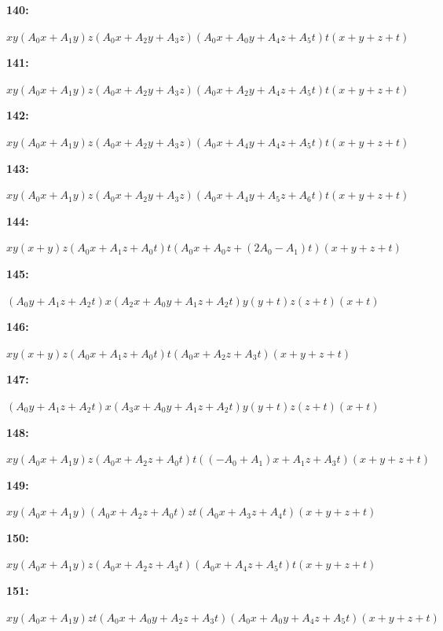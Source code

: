 \documentclass[12pt]{amsart}
\theoremstyle{plain}
\theoremstyle{remark}
\theoremstyle{definition}
\numberwithin{table}{section}
\begin{document}
\noindent\parbox[right]{9mm}{\textbf{140:}}\parbox{3mm}{\hfill}%
\parbox[t]{15cm}{\(xy(A_{0}x + A_{1}y)z(A_{0}x + A_{2}y + A_{3}z)(A_{0}x + A_{0}y + A_{4}z + A_{5}t)t(x + y + z + t)\)}

\noindent\parbox[right]{9mm}{\textbf{141:}}\parbox{3mm}{\hfill}%
\parbox[t]{15cm}{\(xy(A_{0}x + A_{1}y)z(A_{0}x + A_{2}y + A_{3}z)(A_{0}x + A_{2}y + A_{4}z + A_{5}t)t(x + y + z + t)\)}

\noindent\parbox[right]{9mm}{\textbf{142:}}\parbox{3mm}{\hfill}%
\parbox[t]{15cm}{\(xy(A_{0}x + A_{1}y)z(A_{0}x + A_{2}y + A_{3}z)(A_{0}x + A_{4}y + A_{4}z + A_{5}t)t(x + y + z + t)\)}

\noindent\parbox[right]{9mm}{\textbf{143:}}\parbox{3mm}{\hfill}%
\parbox[t]{15cm}{\(xy(A_{0}x + A_{1}y)z(A_{0}x + A_{2}y + A_{3}z)(A_{0}x + A_{4}y + A_{5}z + A_{6}t)t(x + y + z + t)\)}

\noindent\parbox[right]{9mm}{\textbf{144:}}\parbox{3mm}{\hfill}%
\parbox[t]{15cm}{\(xy(x + y)z(A_{0}x + A_{1}z + A_{0}t)t(A_{0}x + A_{0}z + (2A_{0} - A_{1})t)(x + y + z + t)\)}

\noindent\parbox[right]{9mm}{\textbf{145:}}\parbox{3mm}{\hfill}%
\parbox[t]{15cm}{\((A_{0}y + A_{1}z + A_{2}t)x(A_{2}x + A_{0}y + A_{1}z + A_{2}t)y(y + t)z(z + t)(x + t)\)}

\noindent\parbox[right]{9mm}{\textbf{146:}}\parbox{3mm}{\hfill}%
\parbox[t]{15cm}{\(xy(x + y)z(A_{0}x + A_{1}z + A_{0}t)t(A_{0}x + A_{2}z + A_{3}t)(x + y + z + t)\)}

\noindent\parbox[right]{9mm}{\textbf{147:}}\parbox{3mm}{\hfill}%
\parbox[t]{15cm}{\((A_{0}y + A_{1}z + A_{2}t)x(A_{3}x + A_{0}y + A_{1}z + A_{2}t)y(y + t)z(z + t)(x + t)\)}

\noindent\parbox[right]{9mm}{\textbf{148:}}\parbox{3mm}{\hfill}%
\parbox[t]{15cm}{\(xy(A_{0}x + A_{1}y)z(A_{0}x + A_{2}z + A_{0}t)t((-A_{0} + A_{1})x + A_{1}z + A_{3}t)(x + y + z + t)\)}

\noindent\parbox[right]{9mm}{\textbf{149:}}\parbox{3mm}{\hfill}%
\parbox[t]{15cm}{\(xy(A_{0}x + A_{1}y)(A_{0}x + A_{2}z + A_{0}t)zt(A_{0}x + A_{3}z + A_{4}t)(x + y + z + t)\)}

\noindent\parbox[right]{9mm}{\textbf{150:}}\parbox{3mm}{\hfill}%
\parbox[t]{15cm}{\(xy(A_{0}x + A_{1}y)z(A_{0}x + A_{2}z + A_{3}t)(A_{0}x + A_{4}z + A_{5}t)t(x + y + z + t)\)}

\noindent\parbox[right]{9mm}{\textbf{151:}}\parbox{3mm}{\hfill}%
\parbox[t]{15cm}{\(xy(A_{0}x + A_{1}y)zt(A_{0}x + A_{0}y + A_{2}z + A_{3}t)(A_{0}x + A_{0}y + A_{4}z + A_{5}t)(x + y + z + t)\)}
\end{document}
